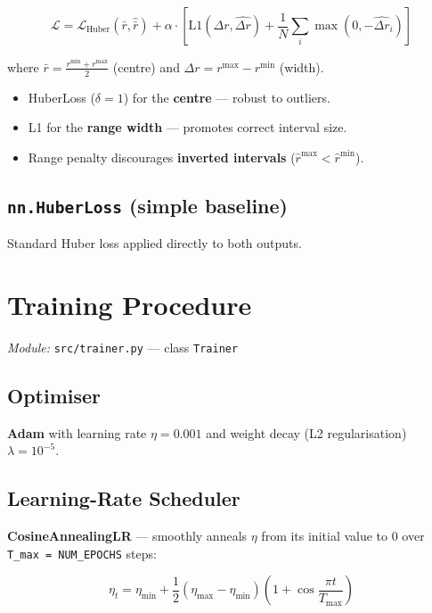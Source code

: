 \documentclass[12pt,a4paper]{article}
\newcommand{\codeinline}[1]{\texttt{\small #1}}
\begin{document}
\begin{equation}
  \mathcal{L} = \mathcal{L}_{\text{Huber}}(\bar{r}, \hat{\bar{r}})
  + \alpha \cdot \left[\text{L1}(\Delta r, \widehat{\Delta r})
  + \frac{1}{N}\sum_i \max(0, -\widehat{\Delta r}_i)\right]
\end{equation}

where $\bar{r} = \frac{r^{\min}+r^{\max}}{2}$ (centre) and $\Delta r = r^{\max} - r^{\min}$ (width).
\begin{itemize}[leftmargin=2em]
  \item HuberLoss ($\delta = 1$) for the \textbf{centre} — robust to outliers.
  \item L1 for the \textbf{range width} — promotes correct interval size.
  \item Range penalty discourages \textbf{inverted intervals} ($\hat{r}^{\max} < \hat{r}^{\min}$).
\end{itemize}

\subsection{\texttt{nn.HuberLoss} (simple baseline)}
Standard Huber loss applied directly to both outputs.

\section{Training Procedure}

\textit{Module:} \codeinline{src/trainer.py} — class \codeinline{Trainer}

\subsection{Optimiser}
\textbf{Adam} with learning rate $\eta = 0.001$ and weight decay (L2 regularisation) $\lambda = 10^{-5}$.

\subsection{Learning-Rate Scheduler}
\textbf{CosineAnnealingLR} — smoothly anneals $\eta$ from its initial value to 0 over \codeinline{T\_max = NUM\_EPOCHS} steps:

\begin{equation}
  \eta_t = \eta_{\min} + \frac{1}{2}(\eta_{\max} - \eta_{\min})\left(1 + \cos\!\frac{\pi t}{T_{\max}}\right)
\end{equation}
\end{document}
